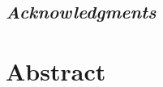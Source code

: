 \documentclass[12pt,a4paper,oldfontcommands,openright]{memoir}
\begin{document}
\sloppy



\cleardoublepage


\section*{{\em Acknowledgments}}
\label{chap:acknowledgments}

\thispagestyle{empty}
\cleardoublepage





\chapter*[Abstract]{Abstract}


\thispagestyle{empty}
\cleardoublepage


\renewcommand{\contentsname}{\vspace*{-3em} Table of Contents}
\renewcommand{\listfigurename}{\vspace*{-3em} List of Figures}
\renewcommand{\listtablename}{\vspace*{-3em} List of Tables}

\tableofcontents*
\thispagestyle{empty}
\cleardoublepage

\listoffigures*
\thispagestyle{empty}
\cleardoublepage

\listoftables*
\thispagestyle{empty}
\cleardoublepage

\end{document}
